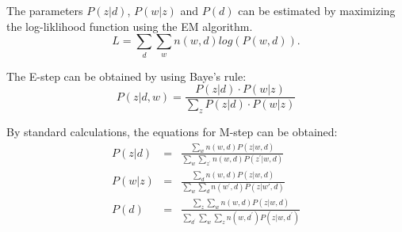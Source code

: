 The parameters $P(z|d)$, $P(w|z)$ and $P(d)$ can be estimated by maximizing the log-liklihood function using the EM algorithm.
\begin{equation}
L = \sum_{d}\sum_{w}n(w,d)log(P(w,d)).
\end{equation}

The E-step can be obtained by using Baye's rule:
\begin{equation}
P(z|d,w) = \frac{P(z|d)\cdot P(w|z)}{\sum_{z}P(z|d)\cdot P(w|z)}
\end{equation}

By standard calculations, the equations for M-step can be obtained:
\begin{eqnarray}
P(z|d) & = & \frac{\sum_{w} n(w,d)P(z|w,d)}{\sum_{w}\sum_{z^{'}}n(w,d)P(z^{'}|w,d)} \\
P(w|z) & = & \frac{\sum_{d} n(w,d)P(z|w,d)}{\sum_{w}\sum_{d}n(w^{'},d)P(z|w{'},d)} \\
P(d) & = & \frac{\sum_{z}\sum_{w} n(w,d)P(z|w,d)}{\sum_{d^{'}}\sum_{w}\sum_{z}n(w,d^{'})P(z|w,d^{'})}
\end{eqnarray}



